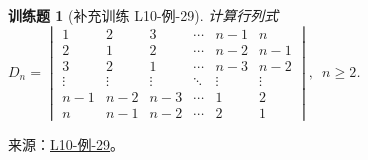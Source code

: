\documentclass[UTF8,12pt,a4paper,fontset=fandol]{ctexart}
\newtheorem{exercise}{训练题}[section]
\begin{document}
\begin{exercise}[补充训练 L10-例-29]\label{prob:L10-例-29}
计算行列式$D_n=\begin{vmatrix}
            1      & 2      & 3      & \cdots & n-1    & n      \\
            2      & 1      & 2      & \cdots & n-2    & n-1    \\
            3      & 2      & 1      & \cdots & n-3    & n-2    \\
            \vdots & \vdots & \vdots & \ddots & \vdots & \vdots \\
            n-1    & n-2    & n-3    & \cdots & 1      & 2      \\
            n      & n-1    & n-2    & \cdots & 2      & 1
        \end{vmatrix},\enspace n \geqslant 2$.
\end{exercise}
\noindent 来源：\href{https://github.com/yhwu-is/Linear-Algebra-Left-Undone/blob/new/%E8%AE%B2%E4%B9%89/%E4%B8%93%E9%A2%98/10%20%E8%A1%8C%E5%88%97%E5%BC%8F.tex}{L10-例-29}。
\end{document}

